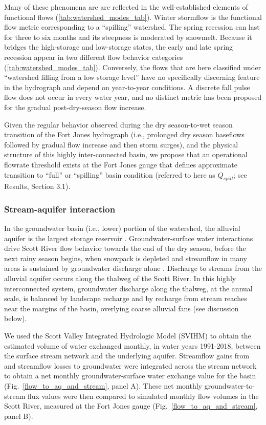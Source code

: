 \documentclass[hess, manuscript]{copernicus}
\begin{document}
Many of these phenomena are are reflected in the well-established
elements of functional flows (\autoref{tab:watershed_modes_tab}). Winter
stormflow is the functional flow metric corresponding to a ``spilling''
watershed. The spring recession can last for three to six months and its
steepness is moderated by snowmelt. Because it bridges the high-storage
and low-storage states, the early and late spring recession appear in
two different flow behavior categories
(\autoref{tab:watershed_modes_tab}). Conversely, the flows that are here
classified under ``watershed filling from a low storage level'' have no
specifically discerning feature in the hydrograph and depend on
year-to-year conditions. A discrete fall pulse flow does not occur in
every water year, and no distinct metric has been proposed for the
gradual post-dry-season flow increase.

Given the regular behavior observed during the dry season-to-wet season
transition of the Fort Jones hydrograph (i.e., prolonged dry season
baseflows followed by gradual flow increase and then storm surges), and
the physical structure of this highly inter-connected basin, we propose
that an operational flowrate threshold exists at the Fort Jones gauge
that defines approximate transition to ``full'' or ``spilling'' basin
condition (referred to here as $Q_{spill}$; see Results, Section 3.1).

\subsubsection{Stream-aquifer interaction}

In the groundwater basin (i.e., lower) portion of the watershed, the
alluvial aquifer is the largest storage reservoir \citep{Mack1958}.
Groundwater-surface water interactions drive Scott River flow behavior
towards the end of the dry season, before the next rainy season begins,
when snowpack is depleted and streamflow in many areas is sustained by
groundwater discharge alone \citep{Foglia2018a}. Discharge to streams
from the alluvial aquifer occurs along the thalweg of the Scott River.
In this highly interconnected system, groundwater discharge along the
thalweg, at the annual scale, is balanced by landscape recharge and by
recharge from stream reaches near the margins of the basin, overlying
coarse alluvial fans (see discussion below).

We used the Scott Valley Integrated Hydrologic Model (SVIHM)
\citep{Tolley2019, Foglia2013a, Foglia2013b} to obtain the estimated
volume of water exchanged monthly, in water years 1991-2018, between the
surface stream network and the underlying aquifer. Streamflow gains from
and streamflow losses to groundwater were integrated across the stream
network to obtain a net monthly groundwater-surface water exchange value
for the basin (Fig.~\ref{flow_to_aq_and_stream}, panel A). These net
monthly groundwater-to-stream flux values were then compared to
simulated monthly flow volumes in the Scott River, measured at the Fort
Jones gauge (Fig.~\ref{flow_to_aq_and_stream}, panel B).
\end{document}
